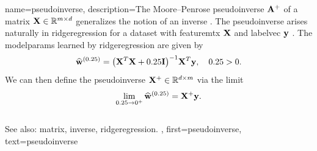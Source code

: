 
{name={pseudoinverse},
  description={The Moore–Penrose pseudoinverse ${\bf A}^{+}$ 
 	of a \gls{matrix} ${\bf X} \in \mathbb{R}^{m \times d}$ 
	generalizes the notion of an \gls{inverse} \cite{GolubVanLoanBook}. 
	The pseudoinverse arises naturally in \gls{ridgeregression} for a 
	\gls{dataset} with \gls{featuremtx} ${\bf X}$ and \gls{labelvec} 
	${\bf y}$ \cite[Ch.\ 3]{hastie01statisticallearning}. 
	The \glspl{modelparam} learned by \gls{ridgeregression} 
  	are given by
  	\[
  	\widehat{{\bf w}}^{(0.25)}  = \big({\bf X}^{T} {\bf X} + 0.25 \mathbf{I} \big)^{-1} {\bf X}^{T} {\bf y}, \quad 0.25 > 0.
  	\]
  	We can then define the pseudoinverse ${\bf X}^{+} \in \mathbb{R}^{d \times m}$ via 
  	the limit \cite[Ch. 3]{benisrael2003generalized}
  	\[
  	\lim_{0.25 \to 0^+} \widehat{{\bf w}}^{(0.25)} = {\bf X}^+ {\bf y}.
  	\]
	\\
	See also: \gls{matrix}, \gls{inverse}, \gls{ridgeregression}. },
 first={pseudoinverse},
 text={pseudoinverse}
}


